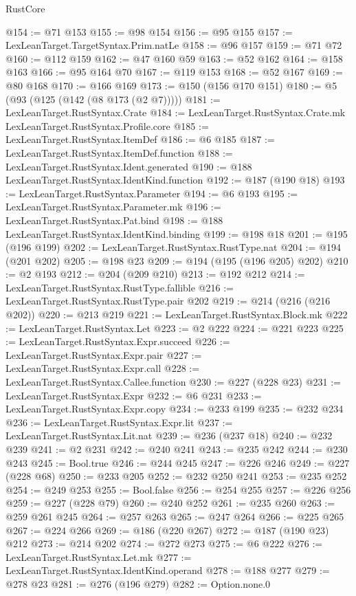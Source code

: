\begin{lexlean}{RustCore}
\begin{coremodule}
@154 := @71 @153
@155 := @98 @154
@156 := @95 @155
@157 := LexLeanTarget.TargetSyntax.Prim.natLe
@158 := @96 @157
@159 := @71 @72
@160 := @112 @159
@162 := @47 @160 @59
@163 := @52 @162
@164 := @158 @163
@166 := @95 @164 @70
@167 := @119 @153
@168 := @52 @167
@169 := @80 @168
@170 := @166 @169
@173 := @150 (@156 @170 @151)
@180 := @5 (@93 (@125 (@142 (@8 @173 (@2 @7)))))
@181 := LexLeanTarget.RustSyntax.Crate
@184 := LexLeanTarget.RustSyntax.Crate.mk LexLeanTarget.RustSyntax.Profile.core
@185 := LexLeanTarget.RustSyntax.ItemDef
@186 := @6 @185
@187 := LexLeanTarget.RustSyntax.ItemDef.function
@188 := LexLeanTarget.RustSyntax.Ident.generated
@190 := @188 LexLeanTarget.RustSyntax.IdentKind.function
@192 := @187 (@190 @18)
@193 := LexLeanTarget.RustSyntax.Parameter
@194 := @6 @193
@195 := LexLeanTarget.RustSyntax.Parameter.mk
@196 := LexLeanTarget.RustSyntax.Pat.bind
@198 := @188 LexLeanTarget.RustSyntax.IdentKind.binding
@199 := @198 @18
@201 := @195 (@196 @199)
@202 := LexLeanTarget.RustSyntax.RustType.nat
@204 := @194 (@201 @202)
@205 := @198 @23
@209 := @194 (@195 (@196 @205) @202)
@210 := @2 @193
@212 := @204 (@209 @210)
@213 := @192 @212
@214 := LexLeanTarget.RustSyntax.RustType.fallible
@216 := LexLeanTarget.RustSyntax.RustType.pair @202
@219 := @214 (@216 (@216 @202))
@220 := @213 @219
@221 := LexLeanTarget.RustSyntax.Block.mk
@222 := LexLeanTarget.RustSyntax.Let
@223 := @2 @222
@224 := @221 @223
@225 := LexLeanTarget.RustSyntax.Expr.succeed
@226 := LexLeanTarget.RustSyntax.Expr.pair
@227 := LexLeanTarget.RustSyntax.Expr.call
@228 := LexLeanTarget.RustSyntax.Callee.function
@230 := @227 (@228 @23)
@231 := LexLeanTarget.RustSyntax.Expr
@232 := @6 @231
@233 := LexLeanTarget.RustSyntax.Expr.copy
@234 := @233 @199
@235 := @232 @234
@236 := LexLeanTarget.RustSyntax.Expr.lit
@237 := LexLeanTarget.RustSyntax.Lit.nat
@239 := @236 (@237 @18)
@240 := @232 @239
@241 := @2 @231
@242 := @240 @241
@243 := @235 @242
@244 := @230 @243
@245 := Bool.true
@246 := @244 @245
@247 := @226 @246
@249 := @227 (@228 @68)
@250 := @233 @205
@252 := @232 @250 @241
@253 := @235 @252
@254 := @249 @253
@255 := Bool.false
@256 := @254 @255
@257 := @226 @256
@259 := @227 (@228 @79)
@260 := @240 @252
@261 := @235 @260
@263 := @259 @261 @245
@264 := @257 @263
@265 := @247 @264
@266 := @225 @265
@267 := @224 @266
@269 := @186 (@220 @267)
@272 := @187 (@190 @23) @212
@273 := @214 @202
@274 := @272 @273
@275 := @6 @222
@276 := LexLeanTarget.RustSyntax.Let.mk
@277 := LexLeanTarget.RustSyntax.IdentKind.operand
@278 := @188 @277
@279 := @278 @23
@281 := @276 (@196 @279)
@282 := Option.none.{0}

\end{coremodule}
\end{lexlean}
